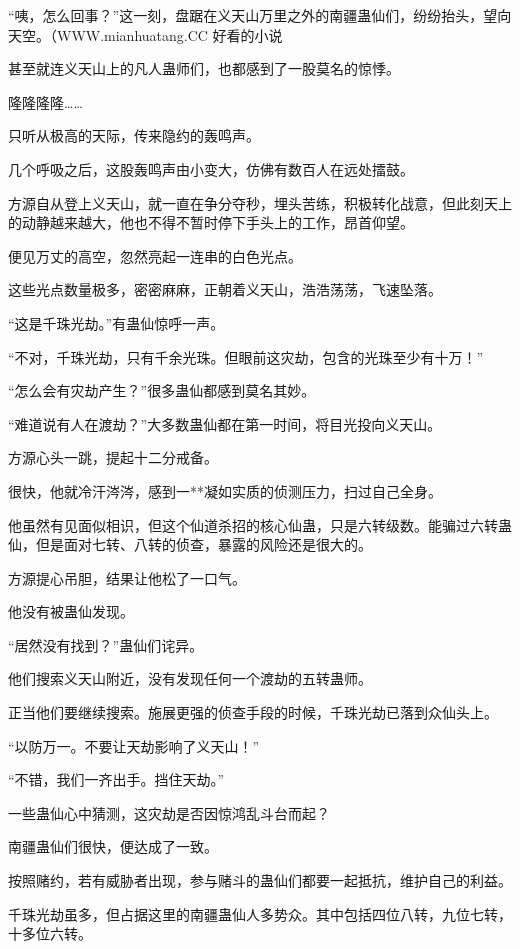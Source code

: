 
\begin{this_body}

“咦，怎么回事？”这一刻，盘踞在义天山万里之外的南疆蛊仙们，纷纷抬头，望向天空。（WWW.mianhuatang.CC 好看的小说

甚至就连义天山上的凡人蛊师们，也都感到了一股莫名的惊悸。

隆隆隆隆……

只听从极高的天际，传来隐约的轰鸣声。

几个呼吸之后，这股轰鸣声由小变大，仿佛有数百人在远处擂鼓。

方源自从登上义天山，就一直在争分夺秒，埋头苦练，积极转化战意，但此刻天上的动静越来越大，他也不得不暂时停下手头上的工作，昂首仰望。

便见万丈的高空，忽然亮起一连串的白色光点。

这些光点数量极多，密密麻麻，正朝着义天山，浩浩荡荡，飞速坠落。

“这是千珠光劫。”有蛊仙惊呼一声。

“不对，千珠光劫，只有千余光珠。但眼前这灾劫，包含的光珠至少有十万！”

“怎么会有灾劫产生？”很多蛊仙都感到莫名其妙。

“难道说有人在渡劫？”大多数蛊仙都在第一时间，将目光投向义天山。

方源心头一跳，提起十二分戒备。

很快，他就冷汗涔涔，感到一**凝如实质的侦测压力，扫过自己全身。

他虽然有见面似相识，但这个仙道杀招的核心仙蛊，只是六转级数。能骗过六转蛊仙，但是面对七转、八转的侦查，暴露的风险还是很大的。

方源提心吊胆，结果让他松了一口气。

他没有被蛊仙发现。

“居然没有找到？”蛊仙们诧异。

他们搜索义天山附近，没有发现任何一个渡劫的五转蛊师。

正当他们要继续搜索。施展更强的侦查手段的时候，千珠光劫已落到众仙头上。

“以防万一。不要让天劫影响了义天山！”

“不错，我们一齐出手。挡住天劫。”

一些蛊仙心中猜测，这灾劫是否因惊鸿乱斗台而起？

南疆蛊仙们很快，便达成了一致。

按照赌约，若有威胁者出现，参与赌斗的蛊仙们都要一起抵抗，维护自己的利益。

千珠光劫虽多，但占据这里的南疆蛊仙人多势众。其中包括四位八转，九位七转，十多位六转。


\end{this_body}

